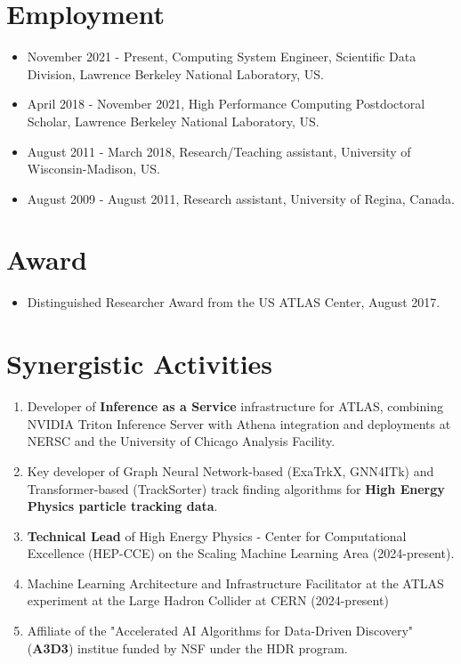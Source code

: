 \documentclass[a4paper, 12pt]{extarticle}
\begin{document}
\section*{Employment}
\begin{itemize}
    \item[] November 2021 - Present, Computing System Engineer, Scientific Data Division, Lawrence Berkeley National Laboratory, US.
    \item[] April 2018 - November 2021, High Performance Computing Postdoctoral Scholar, Lawrence Berkeley National Laboratory, US.
    \item[] August 2011 - March 2018, Research/Teaching assistant, University of Wisconsin-Madison, US.
    \item[] August 2009 - August 2011, Research assistant, University of Regina, Canada.
\end{itemize}

\section*{Award}
\begin{itemize}
    \item Distinguished Researcher Award from the US ATLAS Center, August 2017.
\end{itemize}

\section*{Synergistic Activities}

\begin{enumerate}
    \item Developer of \textbf{Inference as a Service} infrastructure for ATLAS, combining NVIDIA Triton Inference Server with Athena integration and deployments at NERSC and the University of Chicago Analysis Facility.
    \item Key developer of Graph Neural Network-based (ExaTrkX, GNN4ITk) and Transformer-based (TrackSorter) track finding algorithms for \textbf{High Energy Physics particle tracking data}.
    \item \textbf{Technical Lead} of High Energy Physics - Center for Computational Excellence (HEP-CCE) on the Scaling Machine Learning Area (2024-present).
    \item Machine Learning Architecture and Infrastructure Facilitator at the ATLAS experiment at the Large Hadron Collider at CERN (2024-present)
    \item Affiliate of the "Accelerated AI Algorithms for Data-Driven Discovery" (\textbf{A3D3}) institue funded by NSF under the HDR program.
\end{enumerate}








\end{document}
